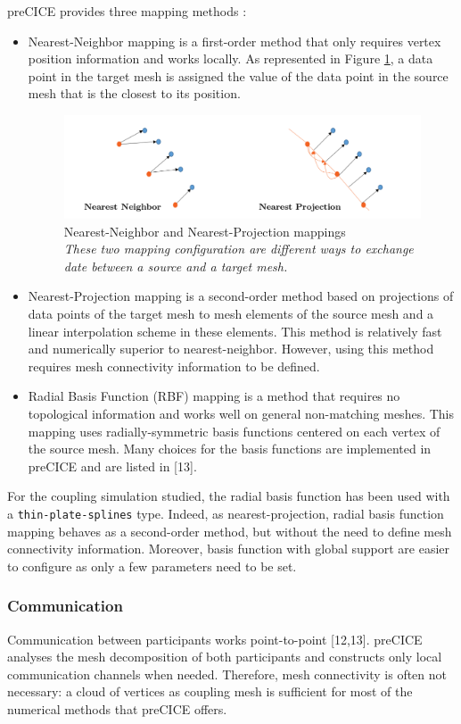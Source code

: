 \documentclass[oneside,11pt,times]{book}
\begin{document}
preCICE provides three mapping methods :
\begin{itemize}
    \item Nearest-Neighbor mapping is a first-order method that only requires vertex position information and works locally. As represented in Figure \ref{mapping}, a data point in the target mesh is assigned the value of the data point in the source mesh that is the closest to its position.
\begin{figure}[H]
    \centering
    \includegraphics[width=14cm]{imgs/Illustrations/mapping.png}
    \caption{Nearest-Neighbor and Nearest-Projection mappings\\ \emph{These two mapping configuration are different ways to exchange date between a source and a target mesh.}}
    \label{mapping}
\end{figure}
    \item Nearest-Projection mapping is a second-order method based on projections of data points of the target mesh to mesh elements of the source mesh and a linear interpolation scheme in these elements. This method is relatively fast and numerically superior to nearest-neighbor. However, using this method requires mesh connectivity information to be defined.
    \item Radial Basis Function (RBF) mapping is a method that requires no topological information and works well on general non-matching meshes. This mapping uses radially-symmetric basis functions centered on each vertex of the source mesh. Many choices for the basis functions are implemented in preCICE and are listed in [13].
\end{itemize}

For the coupling simulation studied, the radial basis function has been used with a \texttt{thin-plate-splines} type. Indeed, as nearest-projection, radial basis function mapping behaves as a second-order method, but without the need to define mesh connectivity information. Moreover, basis function with global support are easier to configure as only a few parameters need to be set.

\subsubsection{Communication}
Communication between participants works point-to-point [12,13]. preCICE analyses the mesh decomposition of both participants and constructs only local communication channels when needed. Therefore, mesh connectivity is often not necessary: a cloud of vertices as coupling mesh is sufficient for most of the numerical methods that preCICE offers.
\end{document}
